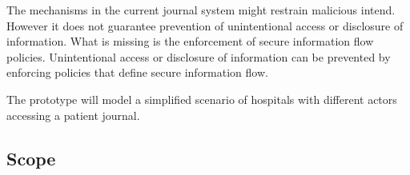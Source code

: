 
The mechanisms in the current journal system might restrain malicious intend. However it does not guarantee prevention of unintentional access or disclosure of information\cite{Harman2012}. 
What is missing is the enforcement of secure information flow policies. Unintentional access or disclosure of information can be prevented by enforcing policies that define secure information flow.

The prototype will model a simplified scenario of hospitals with different actors accessing a patient journal. 







\subsection{Scope} 

